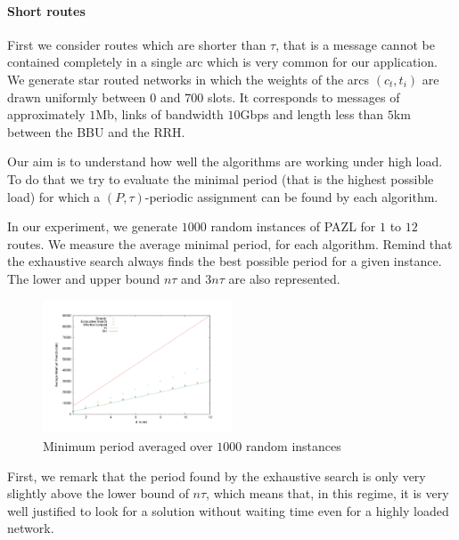 \documentclass[10pt, conference, letterpaper]{IEEEtran}
\begin{document}
      \paragraph{Short routes}
      
      First we consider routes which are shorter than $\tau$, that is a message cannot be contained completely in a single arc which is very common for our application. We generate star routed networks in which the weights of the arcs $(c_t,t_i)$ are drawn uniformly between $0$ and $700$ slots. It corresponds to messages of approximately $1$Mb, links of bandwidth $10$Gbps and length less than $5$km between the BBU and the RRH. 
      
      Our aim is to understand how well the algorithms are working under high load. To do that we try to evaluate the minimal period (that is the highest possible load) for which a $(P,\tau)$-periodic assignment can be found by each algorithm. 
      
      In our experiment, we generate $1000$ random instances of PAZL for $1$ to $12$ routes. 
      We measure the average minimal period, for each algorithm. Remind that the exhaustive search always finds the best possible period for a given instance. The lower and upper bound $n\tau$ and $3n\tau$ are also represented.
      
      
        
      \begin{figure}

      \begin{center}
	\includegraphics[width=0.5\textwidth]{periode_petite.pdf}
      \end{center}
      \caption{Minimum period averaged over $1000$ random instances}
      \end{figure}
      
      First, we remark that the period found by the exhaustive search is only very slightly above the lower bound of $n\tau$, which means that, in this regime, it is very well justified to look for a solution without waiting time even for a highly loaded network. 
      
\end{document}
